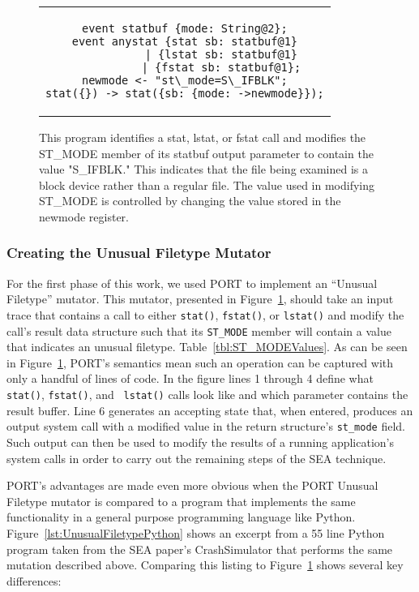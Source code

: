 \begin{figure}[H]
\centering
\begin{tabular}{c}
\begin{lstlisting}
event statbuf {mode: String@2};
event anystat {stat sb: statbuf@1}
           | {lstat sb: statbuf@1}
           | {fstat sb: statbuf@1};
newmode <- "st\_mode=S\_IFBLK";
stat({}) -> stat({sb: {mode: ->newmode}});
\end{lstlisting}
\end{tabular}
\caption{This program identifies a stat, lstat, or fstat call and modifies
  the ST\_MODE member of its statbuf output parameter to contain the value
  "S\_IFBLK."  This indicates that the file being examined is a block device
  rather than a regular file.  The value used in modifying ST\_MODE is
  controlled by changing the value stored in the newmode register.}
\label{lst:UnusualFiletypePORT}
\end{figure}

\subsubsection{Creating the Unusual Filetype Mutator}
\label{subsub:UnusualFiletype}
For the first phase of this work,
we used PORT to implement an ``Unusual Filetype''
mutator.
This mutator, presented in
Figure~\ref{lst:UnusualFiletypePORT},
should take an input trace
that contains a call to either {\tt stat()},
{\tt fstat()},
or {\tt lstat()}
and modify the call's result data structure such
that its {\tt ST\_MODE} member will contain a value
that indicates an unusual filetype.
Table~\ref{tbl:ST_MODEValues}.  As can be seen in
Figure~\ref{lst:UnusualFiletypePORT}, PORT's semantics mean such an
operation can be captured with only a handful of lines of code.  In the
figure
lines 1 through 4 define what {\tt stat()}, {\tt fstat()}, and {\tt
lstat()} calls look like and which parameter contains the result buffer.
Line 6 generates an accepting state that, when entered, produces an output
system call with a modified value in the return structure's {\tt st\_mode}
field.  Such output can then be used to modify the results of a running
application's system calls in order to carry out the remaining steps of the
SEA technique.

PORT's advantages are made even more obvious when the PORT Unusual
Filetype mutator is compared to a program that implements the same
functionality in a general purpose programming language like Python.
Figure~\ref{lst:UnusualFiletypePython} shows an excerpt from a 55 line
Python program taken from the SEA paper's CrashSimulator that performs the
same mutation described above.  Comparing this listing to
Figure~\ref{lst:UnusualFiletypePORT} shows several key differences:

